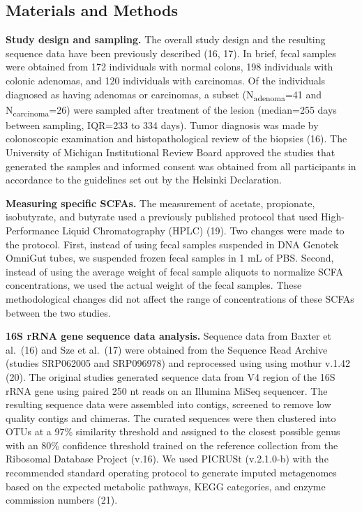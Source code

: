 \documentclass[11pt,]{article}
\begin{document}
\newpage

\hypertarget{materials-and-methods}{%
\subsection{Materials and Methods}\label{materials-and-methods}}

\textbf{Study design and sampling.} The overall study design and the
resulting sequence data have been previously described (16, 17). In
brief, fecal samples were obtained from 172 individuals with normal
colons, 198 individuals with colonic adenomas, and 120 individuals with
carcinomas. Of the individuals diagnosed as having adenomas or
carcinomas, a subset (N\textsubscript{adenoma}=41 and
N\textsubscript{carcinoma}=26) were sampled after treatment of the
lesion (median=255 days between sampling, IQR=233 to 334 days). Tumor
diagnosis was made by colonoscopic examination and histopathological
review of the biopsies (16). The University of Michigan Institutional
Review Board approved the studies that generated the samples and
informed consent was obtained from all participants in accordance to the
guidelines set out by the Helsinki Declaration.

\textbf{Measuring specific SCFAs.} The measurement of acetate,
propionate, isobutyrate, and butyrate used a previously published
protocol that used High-Performance Liquid Chromatography (HPLC) (19).
Two changes were made to the protocol. First, instead of using fecal
samples suspended in DNA Genotek OmniGut tubes, we suspended frozen
fecal samples in 1 mL of PBS. Second, instead of using the average
weight of fecal sample aliquots to normalize SCFA concentrations, we
used the actual weight of the fecal samples. These methodological
changes did not affect the range of concentrations of these SCFAs
between the two studies.

\textbf{16S rRNA gene sequence data analysis.} Sequence data from Baxter
et al.~(16) and Sze et al.~(17) were obtained from the Sequence Read
Archive (studies SRP062005 and SRP096978) and reprocessed using using
mothur v.1.42 (20). The original studies generated sequence data from V4
region of the 16S rRNA gene using paired 250 nt reads on an Illumina
MiSeq sequencer. The resulting sequence data were assembled into
contigs, screened to remove low quality contigs and chimeras. The
curated sequences were then clustered into OTUs at a 97\% similarity
threshold and assigned to the closest possible genus with an 80\%
confidence threshold trained on the reference collection from the
Ribosomal Database Project (v.16). We used PICRUSt (v.2.1.0-b) with the
recommended standard operating protocol to generate imputed metagenomes
based on the expected metabolic pathways, KEGG categories, and enzyme
commission numbers (21).
\end{document}
